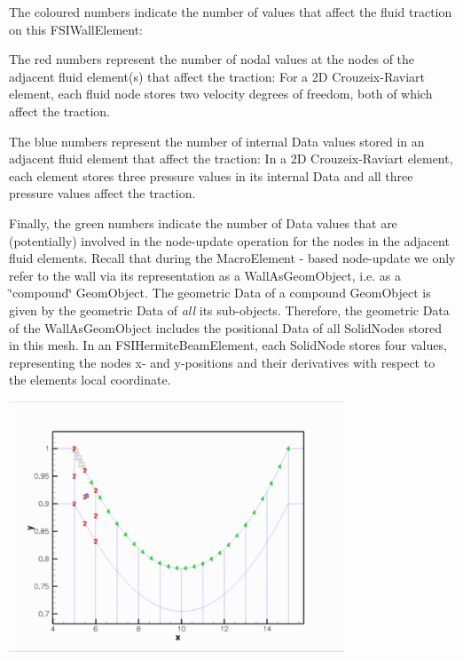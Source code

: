 \begin{DoxyItemize}
\begin{DoxyItemize}
\item The coloured numbers indicate the number of values that affect the fluid traction on this {\ttfamily F\+S\+I\+Wall\+Element\+:} 
\begin{DoxyItemize}
\item The red numbers represent the number of nodal values at the nodes of the adjacent fluid element(s) that affect the traction\+: For a 2D Crouzeix-\/\+Raviart element, each fluid node stores two velocity degrees of freedom, both of which affect the traction.
\item The blue numbers represent the number of internal {\ttfamily Data} values stored in an adjacent fluid element that affect the traction\+: In a 2D Crouzeix-\/\+Raviart element, each element stores three pressure values in its internal {\ttfamily Data} and all three pressure values affect the traction.
\item Finally, the green numbers indicate the number of {\ttfamily Data} values that are (potentially) involved in the node-\/update operation for the nodes in the adjacent fluid elements. Recall that during the {\ttfamily Macro\+Element} -\/ based node-\/update we only refer to the wall via its representation as a {\ttfamily Wall\+As\+Geom\+Object}, i.\+e. as a \char`\"{}compound\char`\"{} {\ttfamily Geom\+Object}. The geometric {\ttfamily Data} of a compound {\ttfamily Geom\+Object} is given by the geometric {\ttfamily Data} of {\itshape all} its sub-\/objects. Therefore, the geometric {\ttfamily Data} of the {\ttfamily Wall\+As\+Geom\+Object} includes the positional {\ttfamily Data} of all {\ttfamily Solid\+Nodes} stored in this mesh. In an {\ttfamily F\+S\+I\+Hermite\+Beam\+Element}, each {\ttfamily Solid\+Node} stores four values, representing the node\textquotesingle{}s x-\/ and y-\/positions and their derivatives with respect to the element\textquotesingle{}s local coordinate.
\end{DoxyItemize}
\end{DoxyItemize} 
\begin{DoxyImage}
\includegraphics[width=0.75\textwidth]{crozier_raviart_fsi_macro}
\end{DoxyImage}



\end{DoxyItemize}
